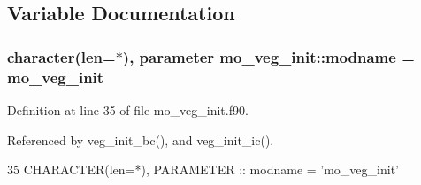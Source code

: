 \subsection{Variable Documentation}
\hypertarget{namespacemo__veg__init_a29fc1d9443f5600fe324d7f02b8c3dbf}{}
\subsubsection[{modname}]{\setlength{\rightskip}{0pt plus 5cm}character(len=$\ast$), parameter mo\+\_\+veg\+\_\+init\+::modname = \textquotesingle{}mo\+\_\+veg\+\_\+init\textquotesingle{}}\label{namespacemo__veg__init_a29fc1d9443f5600fe324d7f02b8c3dbf}


Definition at line 35 of file mo\+\_\+veg\+\_\+init.\+f90.



Referenced by veg\+\_\+init\+\_\+bc(), and veg\+\_\+init\+\_\+ic().


\begin{DoxyCode}
35   \textcolor{keywordtype}{CHARACTER(len=*)}, \textcolor{keywordtype}{PARAMETER} :: modname = \textcolor{stringliteral}{'mo\_veg\_init'}
\end{DoxyCode}
